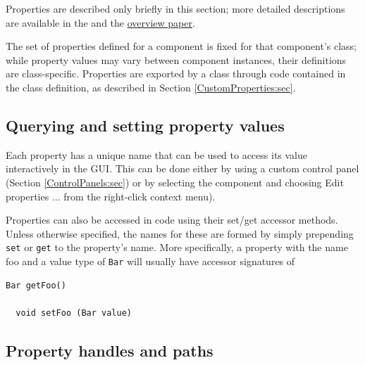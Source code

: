 Properties are described only briefly in this section; 
more detailed descriptions are available in the\pdfbreak
{} and the 
\href{http://www.artisynth.org/doc/artisynth.pdf}{overview paper}.

The set of properties defined for a component is fixed for that
component's class; while property values may vary between component
instances, their definitions are class-specific.  
Properties are exported by a class through code contained in the class
definition, as described in Section \ref{CustomProperties:sec}.

\subsection{Querying and setting property values}
\label{ControllingPropertyValues:sec}

Each property has a unique name that can be used to access its value
interactively in the GUI. This can be done either by using a custom
control panel (Section \ref{ControlPanels:sec}) or by selecting the
component and choosing {\sf Edit properties ...} from the right-click
context menu).

Properties can also be accessed in code using their set/get accessor
methods. Unless otherwise specified, the names for these are formed by
simply prepending {\tt set} or {\tt get} to the property's name.
More specifically, a property with the name {\sf foo} and a value type
of {\tt Bar} will usually have accessor signatures of
%
\begin{lstlisting}[]
  Bar getFoo()

  void setFoo (Bar value)
\end{lstlisting}
%

\subsection{Property handles and paths}
\label{PropertyHandlesAndPaths:sec}

